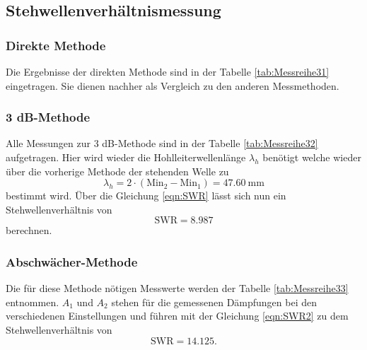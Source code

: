 \subsection{Stehwellenverhältnismessung}

\subsubsection{Direkte Methode}
Die Ergebnisse der direkten Methode sind in der Tabelle \ref{tab:Messreihe31} eingetragen. Sie dienen nachher als Vergleich zu den anderen Messmethoden.

\subsubsection{3 dB-Methode}
Alle Messungen zur 3 dB-Methode sind in der Tabelle \ref{tab:Messreihe32} aufgetragen. Hier wird wieder die Hohlleiterwellenlänge $\lambda_h$ 
benötigt welche wieder über die vorherige Methode der stehenden Welle zu
\begin{equation*}
\lambda_h = 2 \cdot (\text{Min}_2 - \text{Min}_1) = \SI{47.60}{\milli\meter}
\end{equation*}
bestimmt wird.
Über die Gleichung \ref{eqn:SWR} lässt sich nun ein Stehwellenverhältnis von
\begin{equation*}
\text{SWR} = 8.987
\end{equation*}
berechnen.

\subsubsection{Abschwächer-Methode}
Die für diese Methode nötigen Messwerte werden der Tabelle \ref{tab:Messreihe33} entnommen.
$A_1$ und $A_2$ stehen für die gemessenen Dämpfungen bei den verschiedenen Einstellungen und führen mit der Gleichung 
\eqref{eqn:SWR2} zu dem Stehwellenverhältnis von
\begin{equation*}
\text{SWR} = 14.125.
\end{equation*}
